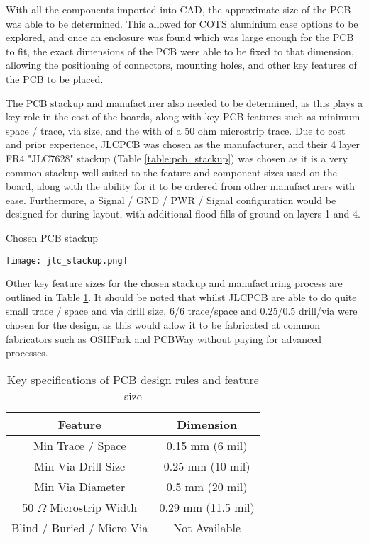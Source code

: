 With all the components imported into CAD, the approximate size of the PCB was able to be determined. This allowed for COTS aluminium case options to be explored, and once an enclosure was found which was large enough for the PCB to fit, the exact dimensions of the PCB were able to be fixed to that dimension, allowing the positioning of connectors, mounting holes, and other key features of the PCB to be placed. 

The PCB stackup and manufacturer also needed to be determined, as this plays a key role in the cost of the boards, along with key PCB features such as minimum space / trace, via size, and the with of a 50 ohm microstrip trace. Due to cost and prior experience, JLCPCB was chosen as the manufacturer, and their 4 layer FR4 "JLC7628" stackup (Table \ref{table:pcb_stackup}) was chosen as it is a very common stackup well suited to the feature and component sizes used on the board, along with the ability for it to be ordered from other manufacturers with ease. Furthermore, a Signal / GND / PWR / Signal configuration would be designed for during layout, with additional flood fills of ground on layers 1 and 4. 

\begin{table}[h!]
	\centering
	\caption{Chosen PCB stackup}
	\texttt{[image: jlc\_stackup.png]}
	\label{table:pcb_stackup}
\end{table}

Other key feature sizes for the chosen stackup and manufacturing process are outlined in Table \ref{table:pcb_specs}. It should be noted that whilst JLCPCB are able to do quite small trace / space and via drill size, 6/6 trace/space and 0.25/0.5 drill/via were chosen for the design, as this would allow it to be fabricated at common fabricators such as OSHPark and PCBWay without paying for advanced processes. 
\begin{table}[h!]
	\caption{Key specifications of PCB design rules and feature size}
	\label{table:pcb_specs}
	\centering
	\begin{tabular}{|c|c|}
		\hline
		\textbf{Feature}                          & \textbf{Dimension} \\ \hline
		Min Trace / Space                         & 0.15 mm (6 mil)   \\ \hline
		Min Via Drill Size                        & 0.25 mm (10 mil)     \\ \hline
		Min Via Diameter                          & 0.5 mm (20 mil)   \\ \hline
		50 $\Omega$ Microstrip Width              & 0.29 mm (11.5 mil) \\ \hline
		Blind / Buried / Micro Via                & Not Available \\ \hline
	\end{tabular}
\end{table} 

